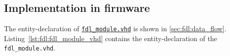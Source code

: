 \clearpage

\subsection{Implementation in firmware}
\label{sec:fdl:implementation_firmware}

The entity-declaration of \href{\gitbranch/firmware/hdl/payload/fdl_module.vhd}{\texttt{fdl\_module.vhd}} is shown in \ref{sec:fdl:data_flow}.\\

Listing~\ref{lst:fdl:fdl_module_vhd} contains the entity-declaration of the \texttt{fdl\_module.vhd}.\\



